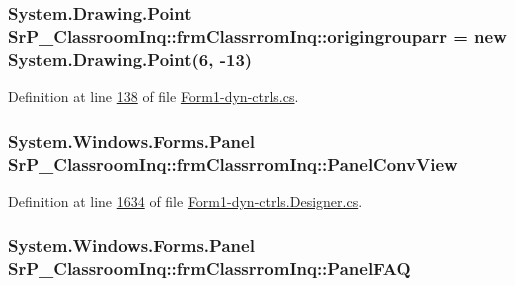 \hypertarget{class_sr_p___classroom_inq_1_1frm_classrrom_inq_ace01ba3289e75624d67b90f742c195f5}{
\subsubsection[{origingrouparr}]{\setlength{\rightskip}{0pt plus 5cm}\-System.\-Drawing.\-Point {\bf \-Sr\-P\-\_\-\-Classroom\-Inq\-::frm\-Classrrom\-Inq\-::origingrouparr} = new \-System.\-Drawing.\-Point(6, -\/13)}}
\label{class_sr_p___classroom_inq_1_1frm_classrrom_inq_ace01ba3289e75624d67b90f742c195f5}


\-Definition at line \hyperlink{_form1-dyn-ctrls_8cs_source_l00138}{138} of file \hyperlink{_form1-dyn-ctrls_8cs_source}{\-Form1-\/dyn-\/ctrls.\-cs}.

\hypertarget{class_sr_p___classroom_inq_1_1frm_classrrom_inq_ae5d62ffd766ae877bf37d56567d836d5}{
\subsubsection[{\-Panel\-Conv\-View}]{\setlength{\rightskip}{0pt plus 5cm}\-System.\-Windows.\-Forms.\-Panel {\bf \-Sr\-P\-\_\-\-Classroom\-Inq\-::frm\-Classrrom\-Inq\-::\-Panel\-Conv\-View}}}
\label{class_sr_p___classroom_inq_1_1frm_classrrom_inq_ae5d62ffd766ae877bf37d56567d836d5}


\-Definition at line \hyperlink{_form1-dyn-ctrls_8_designer_8cs_source_l01634}{1634} of file \hyperlink{_form1-dyn-ctrls_8_designer_8cs_source}{\-Form1-\/dyn-\/ctrls.\-Designer.\-cs}.

\hypertarget{class_sr_p___classroom_inq_1_1frm_classrrom_inq_ae18ea5d89fce8227797626585e3e2a1a}{
\subsubsection[{\-Panel\-F\-A\-Q}]{\setlength{\rightskip}{0pt plus 5cm}\-System.\-Windows.\-Forms.\-Panel {\bf \-Sr\-P\-\_\-\-Classroom\-Inq\-::frm\-Classrrom\-Inq\-::\-Panel\-F\-A\-Q}}}
\label{class_sr_p___classroom_inq_1_1frm_classrrom_inq_ae18ea5d89fce8227797626585e3e2a1a}


